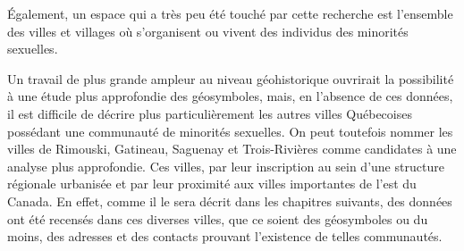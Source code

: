 Également, un espace qui a très peu été touché par cette recherche est l'ensemble des villes et villages où s'organisent ou vivent des individus des minorités sexuelles. 


Un travail de plus grande ampleur au niveau géohistorique ouvrirait la possibilité à une étude plus approfondie des géosymboles, mais, en l'absence de ces données, il est difficile de décrire plus particulièrement les autres villes Québecoises possédant une communauté de minorités sexuelles. 
On peut toutefois nommer les villes de Rimouski, Gatineau, Saguenay et Trois-Rivières comme candidates à une analyse plus approfondie. 
Ces villes, par leur inscription au sein d'une structure régionale urbanisée et par leur proximité aux villes importantes de l'est du Canada. 
En effet, comme il le sera décrit dans les chapitres suivants, des données ont été recensés dans ces diverses villes, que ce soient des géosymboles ou du moins, des adresses et des contacts prouvant l'existence de telles communautés.

